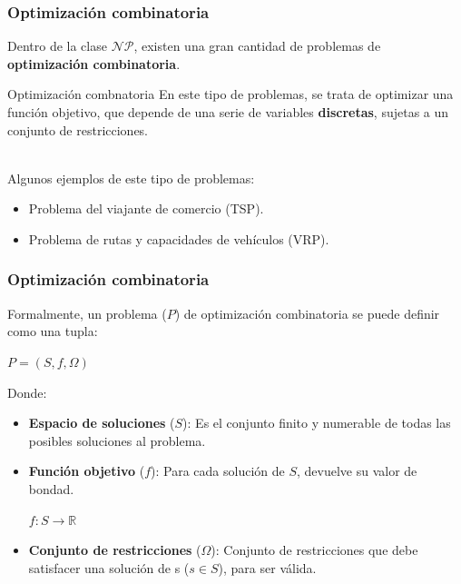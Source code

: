 \documentclass{beamer}
\begin{document}
\begin{frame}
\frametitle{Optimización combinatoria}

Dentro de la clase $\mathcal{NP}$, existen una gran cantidad de problemas de \textbf{optimización combinatoria}. \\

\begin{block}{Optimización combnatoria}
 En este tipo de problemas, se trata de optimizar una función objetivo, que depende de una serie de variables \textbf{discretas}, sujetas a un conjunto de restricciones.
\end{block}
\\
Algunos ejemplos de este tipo de problemas:

\begin{itemize}
    \item Problema del viajante de comercio (TSP).
    \item Problema de rutas y capacidades de vehículos (VRP).
\end{itemize}
\end{frame}

\begin{frame}
\frametitle{Optimización combinatoria}

Formalmente, un problema ($P$) de optimización combinatoria se puede definir como una tupla:

\begin{center}
    $P = (S, f, \Omega)$
\end{center}

Donde:

\begin{itemize}
    \item \textbf{Espacio de soluciones} ($S$): Es el conjunto finito y numerable de todas las posibles soluciones al problema.
    \item \textbf{Función objetivo} ($f$): Para cada solución de $S$, devuelve su valor de bondad.
    \begin{center}
        \begin{math}
            f: S \rightarrow \mathbb{R}
        \end{math}
    \end{center}
    \item \textbf{Conjunto de restricciones} ($\Omega$): Conjunto de restricciones que debe satisfacer una solución de s ($s \in S$), para ser válida.
\end{itemize}

\end{frame}
\end{document}

